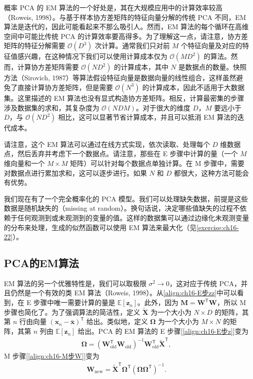 \documentclass[../../main.tex]{subfiles}
\begin{document}
概率 PCA 的 EM 算法的一个好处是，其在大规模应用中的计算效率较高（Roweis, 1998）。与基于样本协方差矩阵的特征向量分解的传统 PCA 不同，EM 算法是迭代的，因此可能看起来不那么吸引人。然而，EM 算法的每个循环在高维空间中可能比传统 PCA 的计算效率要高得多。为了理解这一点，请注意，协方差矩阵的特征分解需要 $\mathcal{O}(D^3)$ 次计算。通常我们只对前 $M$ 个特征向量及对应的特征值感兴趣，在这种情况下我们可以使用计算成本仅为 $\mathcal{O}(MD^2)$ 的算法。然而，计算协方差矩阵需要 $\mathcal{O}(ND^2)$ 的计算成本，其中 $N$ 是数据点的数量。快照方法（Sirovich, 1987）等算法假设特征向量是数据向量的线性组合，这样虽然避免了直接计算协方差矩阵，但是需要 $\mathcal{O}(N^3)$ 的计算成本，因此不适用于大数据集。这里描述的 EM 算法也没有显式构造协方差矩阵。相反，计算最密集的步骤涉及数据集的求和，其复杂度为 $\mathcal{O}(NDM)$。对于很大的维度 $D$，$M$ 要远小于 $D$，与 $\mathcal{O}(ND^2)$ 相比，这可以显著节省计算成本，并且可以抵消 EM 算法的迭代成本。

请注意，这个 EM 算法可以通过在线方式实现，依次读取、处理每个 $D$ 维数据点，然后丢弃并考虑下一个数据点。请注意，那些在 E 步骤中计算的量（一个 $M$ 维向量和一个 $M\times M$ 矩阵）可以针对每个数据点单独计算。在 M 步骤中，需要对数据点进行累加求和，这可以逐步进行。如果 $N$ 和 $D$ 都很大，这种方法可能会有优势。

我们现在有了一个完全概率化的 PCA 模型。我们可以处理缺失数据，前提是这些数据是随机缺失的（missing at random）。换句话说，决定哪些值缺失的过程不依赖于任何观测到或未观测到的变量的值。这样的数据集可以通过边缘化未观测变量的分布来处理，生成的似然函数可以使用 EM 算法来最大化（见\cref{exercise:ch16-22}）。

\subsection{PCA的EM算法}\label{subsection:ch16-PCA的EM算法}

EM 算法的另一个优雅特性是，我们可以取极限 $\sigma^2\rightarrow0$，这对应于传统 PCA，并且仍然是一个有效的类 EM 算法（Roweis, 1998）。从\eqref{align:ch16-E步zz}中可以看到，在 E 步骤中唯一需要计算的量是 $\mathbb{E}[\bm{z}_n]$。此外，因为 $\bm{M}=\bm{W}^{\mathsf T}\bm{W}$，所以 M 步骤也简化了。为了强调算法的简洁性，定义 $\widetilde{\bm{X}}$ 为一个大小为 $N\times D$ 的矩阵，其第 $n$ 行由向量 $(\bm{x}_n-\bar{\bm{x}})^{\mathsf T}$ 给出。类似地，定义 $\bm{\Omega}$ 为一个大小为 $M\times N$ 的矩阵，其第 $n$ 列由 $\mathbb{E}[\bm{z}_n]$ 给出。PCA 的 EM 算法的 E 步骤[\eqref{align:ch16-E步z}]变为
\begin{align}
  \bm{\Omega}=\left(\bm{W}_{\text{old}}^{\mathsf T}\bm{W}_{\text{old}}\right)^{-1}\bm{W}_{\text{old}}^{\mathsf T}\widetilde{\bm{X}}^{\mathsf T},
  \label{align:ch16-PCA-E步}
\end{align}
M 步骤[\eqref{align:ch16-M步W}]变为
\begin{align}
  \bm{W}_{\text{new}}=\widetilde{\bm{X}}^{\mathsf T}\bm{\Omega}^{\mathsf T}\left(\bm{\Omega}\bm{\Omega}^{\mathsf T}\right)^{-1}.
  \label{align:ch16-PCA-M步}
\end{align}
\end{document}
